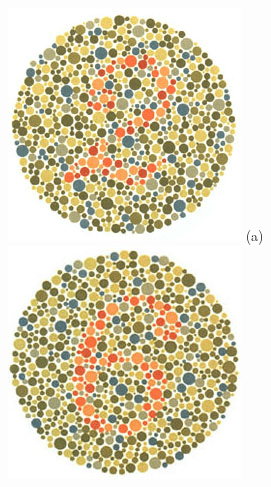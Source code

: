 \documentclass[	12pt, Times, openright, twoside, a4paper, english, brazil]{abntex2}
\begin{document}
\begin{apendicesenv}
\begin{figure}[!htb]
\centering
{\includegraphics[width=\linewidth]{ishihara-fuga/plate10.jpg}}
(a)
\endminipage\hfill
{}
\centering
{\includegraphics[width=\linewidth]{ishihara-fuga/plate11.jpg}}

\end{figure}
\end{apendicesenv}
\end{document}
